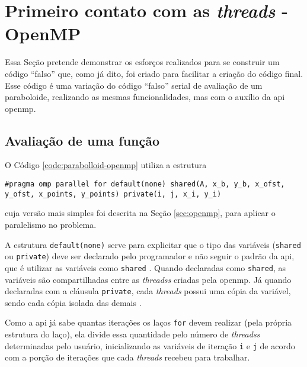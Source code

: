 \section{Primeiro contato com as \textit{threads} - OpenMP}

Essa Seção pretende demonstrar os esforços realizados para se construir um
código ``falso'' que, como já dito, foi criado para facilitar a criação do código final.
Esse código é uma variação do código ``falso'' serial de avaliação de um paraboloide, 
realizando as mesmas funcionalidades, mas com o auxílio da \gls{api} \acrshort{openmp}.

\subsection{Avaliação de uma função}

O Código \ref{code:parabolloid-openmp} utiliza a estrutura
\begin{lstlisting}
#pragma omp parallel for default(none) shared(A, x_b, y_b, x_ofst, y_ofst, x_points, y_points) private(i, j, x_i, y_i)
\end{lstlisting}
cuja versão mais simples foi descrita na Seção \ref{sec:openmp},  para aplicar o paralelismo no problema. 

A estrutura \texttt{default(none)} serve para explicitar que o tipo das variáveis (\texttt{shared} ou \texttt{private}) 
deve ser declarado pelo programador e não seguir o padrão da \acrshort{api}, que é utilizar as variáveis como \texttt{shared} 
\cite{unp:bosco-openmp-conceitos}. Quando declaradas como \texttt{shared}, as variáveis são compartilhadas entre 
as \textit{\glspl{threads}} criadas pela \acrshort{openmp}. Já quando declaradas com a cláusula \texttt{private}, cada \textit{\gls{threads}} 
possui uma cópia da variável, sendo cada cópia isolada das demais \cite{unp:bosco-openmp-conceitos}.

Como a \acrshort{api} já sabe quantas iterações os laços \texttt{for} devem realizar (pela própria estrutura do laço), 
ela divide essa quantidade pelo número de \textit{\glspl{threads}} determinadas pelo usuário, inicializando as variáveis 
de iteração \texttt{i} e \texttt{j} de acordo com a porção de iterações que cada \textit{\gls{threads}} recebeu para 
trabalhar.
